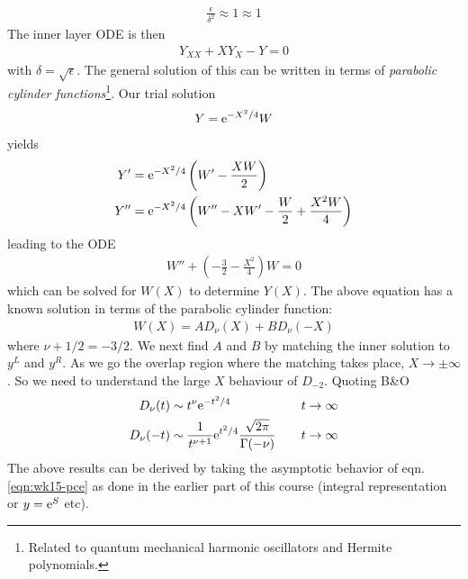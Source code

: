 \begin{gather*}
	\frac{\epsilon}{\delta^2} \approx 1 \approx 1
\end{gather*}
The inner layer ODE is then
\begin{gather*}
	Y_{XX} + X Y_X - Y = 0
\end{gather*}
with $\delta = \sqrt{\epsilon}$. The general solution of this can be written in terms of \emph{parabolic cylinder functions}\footnote{Related to quantum mechanical harmonic oscillators and Hermite polynomials.}. Our trial solution
\begin{gather*}
	Y = \mathrm{e}^{-X^2/4} W
\end{gather*}
yields
\begin{align*}
	Y' &=  \mathrm{e}^{-X^2/4} \left(W' - \frac{XW}{2} \right)\\
	Y'' &= \mathrm{e}^{-X^2/4} \left(W'' - XW' - \frac{W}{2} + \frac{X^2 W}{4} \right)
\end{align*}
leading to the ODE
\begin{gather} \label{eqn:wk15-pce}
	W'' + \left(-\frac{3}{2} - \frac{X^2}{4}\right)W= 0
\end{gather}
which can be solved for $W(X)$ to determine $Y(X)$. The above equation has a known solution in terms of the parabolic cylinder function:
\begin{gather*}
	W(X) = A D_\nu (X) + B D_\nu (-X)
\end{gather*}
where $\nu + 1/2 = -3/2$. We next find $A$ and $B$ by matching the inner solution to $y^L$ and $y^R$. As we go the overlap region where the matching takes place, $X \rightarrow \pm \infty$. So we need to understand the large $X$ behaviour of $D_{-2}$. Quoting B\&O
\begin{align*}
	D_\nu (t) &\sim t^\nu \mathrm{e}^{-t^2/4} \quad &t \rightarrow \infty \\
	D_\nu (-t) &\sim \frac{1}{t^{\nu+1}} \mathrm{e}^{t^2/4} \frac{\sqrt{2\pi}}{\Gamma(-\nu)} \quad &t \rightarrow \infty
\end{align*}
The above results can be derived by taking the asymptotic behavior of eqn. \ref{eqn:wk15-pce} as done in the earlier part of this course (integral representation or $y = \mathrm{e}^S$ etc). 

